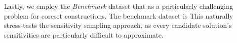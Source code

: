 Lastly, we employ the \emph{Benchmark} dataset that  as a particularly challenging problem for coreset constructions.  The
benchmark dataset is  This naturally stress-tests
the sensitivity sampling approach, as every candidate solution's sensitivities are particularly difficult to approximate. 



